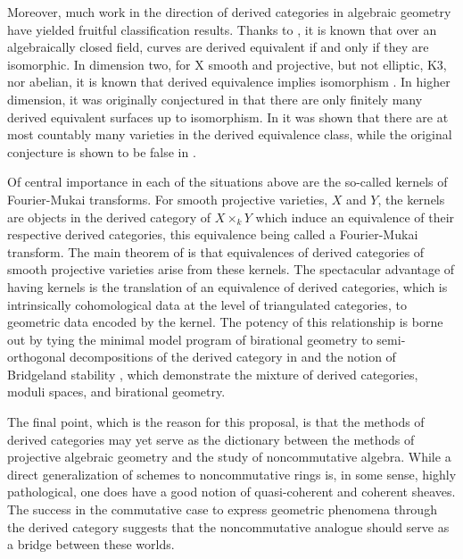 \documentclass[11pt]{article}
\begin{document}
Moreover, much work in the direction of derived categories in algebraic geometry have yielded fruitful classification results.
Thanks to \cite{Orlov1997}, it is known that over an algebraically closed field, curves are derived equivalent if and only if they are isomorphic.
In dimension two, for X smooth and projective, but not elliptic, K3, nor abelian, it is known that derived equivalence implies isomorphism \cite[Prop. 12.1]{HuyFMT}.
In higher dimension, it was originally conjectured in \cite{kawamata2002} that there are only finitely many derived equivalent surfaces up to isomorphism.
In \cite{AnToe} it was shown that there are at most countably many varieties in the derived equivalence class, while the original conjecture is shown to be false in \cite{lesieutre2014}.

Of central importance in each of the situations above are the so-called kernels of Fourier-Mukai transforms.
For smooth projective varieties, $X$ and $Y$, the kernels are objects in the derived category of $X \times_k Y$ which induce an equivalence of their respective derived categories, this equivalence being called a Fourier-Mukai transform.
The main theorem of \cite{Orlov1997} is that equivalences of derived categories of smooth projective varieties arise from these kernels.
The spectacular advantage of having kernels is the translation of an equivalence of derived categories, which is intrinsically cohomological data at the level of triangulated categories, to geometric data encoded by the kernel.
The potency of this relationship is borne out by tying the minimal model program of birational geometry to semi-orthogonal decompositions of the derived category in \cite{Bridgeland02,kawamata2002} and the notion of Bridgeland stability \cite{Bri07, ABCH13, BM14a, BM14b}, which demonstrate the mixture of derived categories, moduli spaces, and birational geometry.

The final point, which is the reason for this proposal, is that the methods of derived categories may yet serve as the dictionary between the methods of projective algebraic geometry and the study of noncommutative algebra.
While a direct generalization of schemes to noncommutative rings is, in some sense, highly pathological, one does have a good notion of quasi-coherent and coherent sheaves.
The success in the commutative case to express geometric phenomena through the derived category suggests that the noncommutative analogue should serve as a bridge between these worlds.
\end{document}
